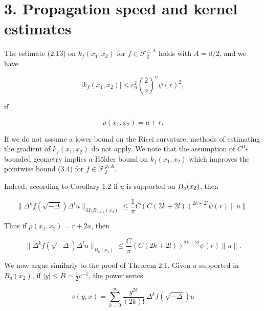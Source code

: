\chapter{3. Propagation speed and kernel estimates}

The estimate (2.13) on $k_f(x_1,x_2)$ for $f\in \mathscr{F}_2^{\varphi,A}$ holds with $A=d/2$, and we have

\begin{equation}\tag{3.4}
|k_f(x_1,x_2)|\le c_n^2\left(\frac{2}{a}\right)^n \psi(r)^2,
\end{equation}

if

\begin{equation}\tag{3.5}
\rho(x_1,x_2)=a+r.
\end{equation}

If we do not assume a lower bound on the Ricci curvature, methods of estimating the gradient of $k_f(x_1,x_2)$ do not apply. We note that the assumption of $C^0$-bounded geometry implies a H\"older bound on $k_f(x_1,x_2)$ which improves the pointwise bound (3.4) for $f\in \mathscr{F}_2^{\varphi,A}$.

Indeed, according to Corollary 1.2 if $u$ is supported on $B_a(x_2)$, then

\begin{equation}\tag{3.6}
\bigl\|\Delta^k f(\sqrt{-\Delta}) \Delta^l u\bigr\|_{M\setminus B_{r+a}(x_2)}
\le \frac{1}{\pi} C(C(2k+2l))^{2k+2l}\psi(r)\|u\|.
\end{equation}

Thus if $\rho(x_1,x_2)=r+2a$, then

\begin{equation}\tag{3.7}
\bigl\|\Delta^k f(\sqrt{-\Delta}) \Delta^l u\bigr\|_{B_a(x_1)}
\le \frac{C}{\pi}(C(2k+2l))^{2k+2l}\psi(r)\|u\|.
\end{equation}

We now argue similarly to the proof of Theorem 2.1. Given $u$ supported in $B_a(x_2)$, if $|y|\le B=\tfrac12 c^{-1}$, the power series

\begin{equation}\tag{3.8}
v(y,x)=\sum_{k=0}^{\infty}\frac{y^{2k}}{(2k)!}\,\Delta^k f(\sqrt{-\Delta})u
\end{equation}

